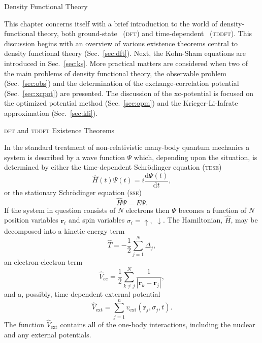 \documentclass[letterpaper, 11 pt]{report}
\begin{document}
\begin{chapter}{Density Functional Theory \label{chap:dft}}

   This chapter concerns itself with a brief introduction to the world of density-functional theory,
   both ground-state~\cite{dft-engel} (\textsc{dft}) and time-dependent~\cite{tddft, ullrich, marques-1}
   (\textsc{tddft}). This discussion begins with an overview  of various existence theorems central to
   density functional theory (Sec.~\ref{sec:dft}). Next, the Kohn-Sham equations are introduced in
   Sec.~\ref{sec:ks}. More practical matters are considered when two of the main problems of density
   functional theory, the observable problem (Sec.~\ref{sec:obs}) and the determination of the
   exchange-correlation potential (Sec.~\ref{sec:xcpot}) are presented. The discussion of the
   xc-potential is focused on the optimized potential method (Sec.~\ref{sec:opm}) and the
   Krieger-Li-Iafrate approximation (Sec.~\ref{sec:kli}).

   \begin{section}{\textsc{dft} and \textsc{tddft} Existence Theorems \label{sec:dft}}

      In the standard treatment of non-relativistic many-body quantum mechanics a system is described by
      a wave function $\Psi$ which, depending upon the situation, is determined by either the
      time-dependent Schr\"{o}dinger equation (\textsc{tdse})
      \begin{equation} \label{eq:tdse}
         \hat{H}(t) \Psi(t) = i \frac{\mathrm{d} \Psi(t)}{\mathrm{d} t},
      \end{equation}
      or the stationary Schr\"{o}dinger equation (\textsc{sse})
      \begin{equation} \label{eq:sse}
         \hat{H} \Psi = E \Psi.
      \end{equation}
      If the system in question consists of $N$ electrons then $\Psi$ becomes a function of $N$ position
      variables $\mathbf{r}_i$ and spin variables $\sigma_i = \uparrow,$ $\downarrow$. The Hamiltonian,
      $\hat{H}$, may be decomposed into a kinetic energy term
      \begin{equation} \label{eq:Top}
         \hat{T} = -\frac{1}{2} \sum\limits^{N}_{j=1} \Delta_j,
      \end{equation}
      an electron-electron term
      \begin{equation} \label{eq:Vee}
         \hat{V}_{ee} = \frac{1}{2} \sum\limits^{N}_{k \neq j}
                        \frac{1}{\left| \mathbf{r}_k - \mathbf{r}_j \right|},
      \end{equation}
      and a, possibly, time-dependent external potential
      \begin{equation} \label{eq:Vext}
         \hat{V}_\mathrm{ext} = \sum\limits^{n}_{j = 1} v_\mathrm{ext} (\mathbf{r}_j, \sigma_j, t).
      \end{equation}
      The function $\hat{V}_\mathrm{ext}$ contains all of the one-body interactions, including the
      nuclear and any external potentials.


\end{section}
\end{chapter}
\end{document}
